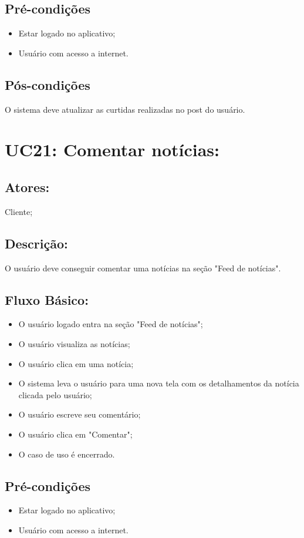 \subsection{Pré-condições}
\begin{itemize}
    \item Estar logado no aplicativo;
    \item Usuário com acesso a internet. 
\end{itemize}

\subsection{Pós-condições}
O sistema deve atualizar as curtidas realizadas no post do usuário. 
\section{UC21: Comentar notícias: }

\subsection{Atores:}
Cliente;
\subsection{Descrição:}
 O usuário deve conseguir comentar uma notícias na seção "Feed de notícias". 
\subsection{Fluxo Básico:}

\begin{itemize}
    \item O usuário logado entra na seção "Feed de notícias";
    \item O usuário visualiza as notícias;
    \item O usuário clica em uma notícia;
    \item O sistema leva o usuário para uma nova tela com os detalhamentos da notícia clicada pelo usuário;
    \item O usuário escreve seu comentário;
    \item O usuário clica em "Comentar";
    \item O caso de uso é encerrado. 
\end{itemize}

\subsection{Pré-condições}
\begin{itemize}
    \item Estar logado no aplicativo;
    \item Usuário com acesso a internet. 
\end{itemize}
